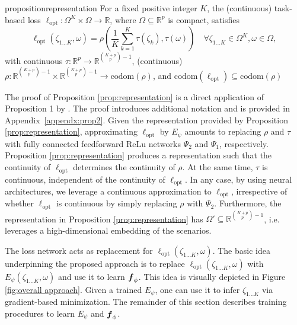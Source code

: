 \begin{restatable}{proposition}{representation}\label{prop:representation}
  For a fixed positive integer $K$, the (continuous) task-based loss $\ell_{\text{opt}} : \Omega^K \times \Omega \rightarrow \mathbb{R}$, where $\Omega \subseteq \mathbb{R}^p$ is compact, satisfies 
  \begin{equation*}\label{eqn:representer}
    \ell_{\text{opt}}(\zeta_{1...K}, \omega) = \rho\left(\frac{1}{K}\sum_{k=1}^K \tau(\zeta_k), \tau(\omega)\right) \quad \forall \zeta_{1...K} \in \Omega^K, \omega \in \Omega,
    \end{equation*}
  with  continuous $\tau : \mathbb{R}^p \rightarrow \mathbb{R}^{{K+p \choose p} - 1}$, (continuous) $\rho : \mathbb{R}^{{K+p \choose p} - 1} \times \mathbb{R}^{{K+p \choose p} - 1} \rightarrow \text{codom}(\rho)$, and $\text{codom}(\ell_{\text{opt}}) \subseteq \text{codom}(\rho)$
\end{restatable}
The proof of Proposition \ref{prop:representation} is a direct application of Proposition 1 by \citet{tabaghi2024universal}. The proof introduces additional notation and is provided in \hbox{Appendix \ref{appendx:prop2}}. Given the representation provided by Proposition \ref{prop:representation}, approximating $\ell_{\text{opt}}$ by $E_{\psi}$ amounts to replacing $\rho$ and $\tau$ with fully connected feedforward ReLu networks $\Psi_2$ and $\Psi_1$, respectively. Proposition \ref{prop:representation} produces a representation such that the continuity of $\ell_{\text{opt}}$ determines the continuity of $\rho$. At the same time, $\tau$ is continuous, independent of the continuity of $\ell_{\text{opt}}$. In any case, by using neural architectures, we leverage a continuous approximation to $\ell_{\text{opt}}$, irrespective of whether $\ell_{\text{opt}}$ is continuous by simply replacing $\rho$ with $\Psi_2$. Furthermore, the representation in Proposition \ref{prop:representation} has $\Omega' \subseteq \mathbb{R}^{{K+p \choose p} - 1}$, i.e. leverages a high-dimensional embedding of the scenarios. 


The loss network acts as replacement for $\ell_{\text{opt}}(\zeta_{1...K}, \omega)$. The basic idea underpinning the proposed approach is to replace $\ell_{\text{opt}}(\zeta_{1...K}, \omega)$ with $E_{\psi}(\zeta_{1...K}, \omega)$ and use it to learn $\boldsymbol{f}_{\phi}$. This idea is visually depicted in Figure \ref{fig:overall approach}. Given a trained $E_{\psi}$, one can use it to infer $\zeta_{1...K}$ via gradient-based minimization. The remainder of this section describes training procedures to learn $E_{\psi}$ and $\boldsymbol{f}_{\phi}$. 

